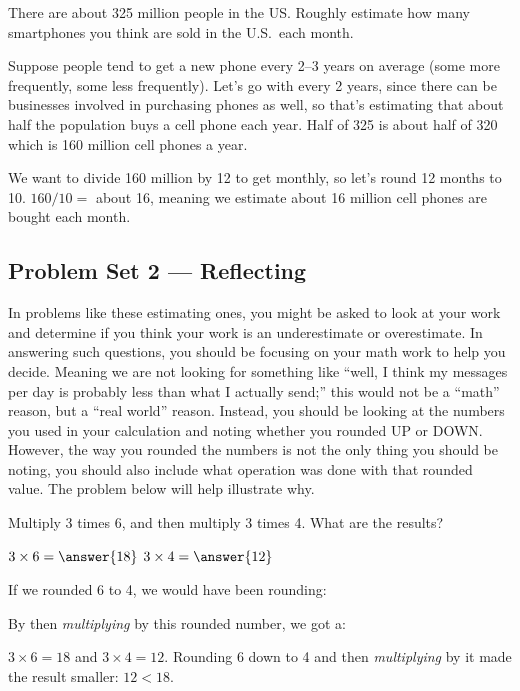 \documentclass[12pt]{ximera}
\begin{document}
\begin{problem}\label{problem:smartphones}
There are about 325 million people in the US. Roughly estimate how many smartphones you
think are sold in the U.S.\ each month.

\begin{freeResponse}
\end{freeResponse}

\begin{solution}
Suppose people tend to get a new phone every 2--3 years on average (some more
frequently, some less frequently). Let's go with every 2 years, since there can be
businesses involved in purchasing phones as well, so that's estimating that about half
the population buys a cell phone each year. Half of 325 is about half of 320 which is
160 million cell phones a year.

We want to divide 160 million by 12 to get monthly, so let's round 12 months to 10.
$160/10 = $ about 16, meaning we estimate about 16 million cell phones are bought each
month.
\end{solution}
\end{problem}

\subsection*{Problem Set 2 --- Reflecting}

In problems like these estimating ones, you might be asked to look at your work and
determine if you think your work is an underestimate or overestimate. In answering such
questions, you should be focusing on your math work to help you decide. Meaning we are
not looking for something like ``well, I think my messages per day is probably less than
what I actually send;'' this would not be a ``math'' reason, but a ``real world''
reason. Instead, you should be looking at the numbers you used in your calculation and
noting whether you rounded UP or DOWN. However, the way you rounded the numbers is not
the only thing you should be noting, you should also include what operation was done
with that rounded value. The problem below will help illustrate why.

\begin{problem}
Multiply 3 times 6, and then multiply 3 times 4. What are the results?

$3 \times 6 = \answer{18}$ \qquad $3 \times 4 = \answer{12}$

If we rounded 6 to 4, we would have been rounding:
\begin{multipleChoice}
\end{multipleChoice}

By then \emph{multiplying} by this rounded number, we got a:
\begin{multipleChoice}
\end{multipleChoice}

\begin{solution}
$3 \times 6 = 18$ and $3 \times 4 = 12$. Rounding 6 down to 4 and then
\emph{multiplying} by it made the result smaller: $12 < 18$.
\end{solution}
\end{problem}
\end{document}
